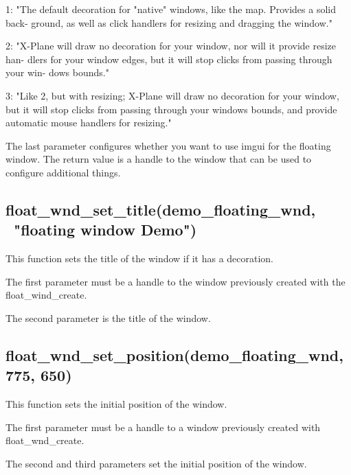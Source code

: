 \documentclass[11pt,parskip=half,a4paper]{scrartcl}
\begin{document}
\hspace*{10mm}	1: "The default decoration for "native" windows, like the map. Provides a solid back-    \hspace*{10mm}  ground, as well as click handlers for resizing and dragging the window."

\hspace*{10mm}	2: "X-Plane will draw no decoration for your window, nor will it provide resize han-
\hspace*{10mm}	dlers for your window edges, but it will stop clicks from passing through your win-
\hspace*{10mm}	dows bounds."

\hspace*{10mm}	3: "Like 2, but with resizing; X-Plane will draw no decoration for your window, but
\hspace*{10mm}	it will stop clicks from passing through your windows bounds, and provide automatic
\hspace*{10mm}	mouse handlers for resizing."

The last parameter configures whether you want to use imgui for the floating window.
The return value is a handle to the window that can be used to configure additional things.

\subsection{\hspace*{1.0mm}float\_wnd\_set\_title(demo\_floating\_wnd, \ "floating window Demo")}

This function sets the title of the window if it has a decoration.

The first parameter must be a handle to the window previously created with the float\_wind\_create.

The second parameter is the title of the window.


\subsection{\hspace*{1.0mm}float\_wnd\_set\_position(demo\_floating\_wnd, 775, 650)}

This function sets the initial position of the window.

The first parameter must be a handle to a window previously created with float\_wnd\_create.

The second and third parameters set the initial position of the window.
\end{document}
